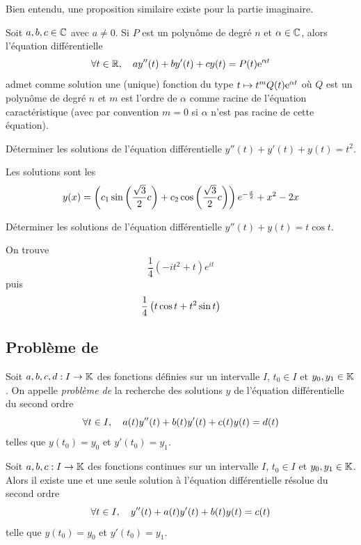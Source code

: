 \documentclass{magnolia}
\begin{document}
\begin{remarqueUnique}
\remarque Bien entendu, une proposition similaire existe pour la partie imaginaire.
\end{remarqueUnique}

\begin{proposition}[utile=-3]
Soit $a,b,c\in\mathbb{C}$ avec $a\neq 0$. Si $P$ est un polynôme de degré $n$ et
$\alpha\in\mathbb{C}$, alors l'équation différentielle
\[\forall t\in \mathbb{R} ,\quad ay''(t)+by'(t)+cy(t)=P(t){\rm e}^{\alpha t}\]
admet comme solution une (unique) fonction du type
$t\mapsto t^m Q(t){\rm e}^{\alpha t}$ où $Q$ est un polynôme de degré $n$ et
$m$ est l'ordre de $\alpha$ comme racine de l'équation
caractéristique (avec par convention $m=0$ si $\alpha$ n'est pas racine
de cette équation).
\end{proposition}

\begin{exos}
\exo Déterminer les solutions de l'équation différentielle
  $y''(t)+y'(t)+y(t)=t^2$.
  \begin{sol}
  Les solutions sont les
  \[y(x)=\left(c_1\sin\left(\frac{\sqrt{3}}{2}c\right)+c_2\cos\left(\frac{\sqrt{3}}{2}c\right)\right)
    e^{-\frac{x}{2}}+x^2-2x\]
  \end{sol}
\exo Déterminer les solutions de l'équation différentielle
  $y''(t)+y(t)=t\cos t$.
  \begin{sol}
  On trouve
  \[\frac{1}{4}(-it^2+t)e^{it}\]
  puis
  \[\frac{1}{4}\left(t\cos t+t^2\sin t\right)\]
  \end{sol}
\end{exos}

\subsection{Problème de }

\begin{definition}[nom={Problème de \nom{Cauchy}}]
Soit $a,b,c,d:I\to\mathbb{K}$ des fonctions définies sur un intervalle $I$, $t_0\in I$ et
$y_0,y_1\in\mathbb{K}$. On appelle \emph{problème de } la recherche des solutions $y$ de
l'équation différentielle du second ordre
\[\forall t\in I ,\quad a(t)y''(t)+b(t)y'(t)+c(t)y(t)=d(t)\]
telles que $y(t_0)=y_0$ et $y'(t_0)=y_1$.
\end{definition}

\begin{theoreme}[nom={Théorème de \nom{Cauchy-Lipschitz}}]
Soit $a,b,c:I\to\mathbb{K}$ des fonctions continues sur un intervalle $I$,
$t_0\in I$ et $y_0,y_1\in\mathbb{K}$. Alors il existe une et une seule solution à
l'équation différentielle résolue du second ordre
\[\forall t\in I ,\quad y''(t)+a(t)y'(t)+b(t)y(t)=c(t)\]
telle que $y(t_0)=y_0$ et $y'(t_0)=y_1$.
\end{theoreme}
\end{document}
